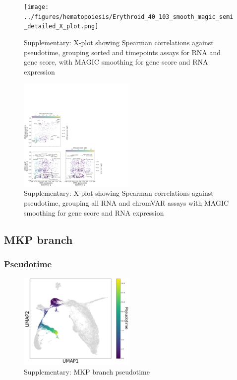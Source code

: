 \documentclass[a4paper]{article}
\begin{document}
\begin{figure}[!htb]
  \centering
  \texttt{[image: ../figures/hematopoiesis/Erythroid\_40\_103\_smooth\_magic\_semi\_detailed\_X\_plot.png]}
  \caption{Supplementary: X-plot showing Spearman correlations against pseudotime, grouping sorted and timepoints assays for RNA and gene score, with MAGIC smoothing for gene score and RNA expression}
\end{figure}

\begin{figure}[!htb]
  \centering
  \includegraphics[width=0.5\textwidth]{../figures/hematopoiesis/Erythroid_40_103_smooth_magic_grouped_X_plot.png}
  \caption{Supplementary: X-plot showing Spearman correlations against pseudotime, grouping all RNA and chromVAR assays with MAGIC smoothing for gene score and RNA expression}
\end{figure}


\subsection{MKP branch}

\subsubsection{Pseudotime}
\begin{figure}[!htb]
  \centering
  \includegraphics[width=0.5\textwidth]{../figures/hematopoiesis/MKP_40_110_single_branch_pseudotime.png}
  \caption{Supplementary: MKP branch pseudotime}
\end{figure}
\end{document}
